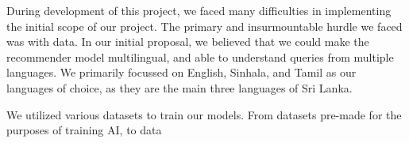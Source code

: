 During development of this project, we faced many difficulties in implementing the initial scope of our project. The primary and insurmountable hurdle we faced was with data. In our initial proposal, we believed that we could make the recommender model multilingual, and able to understand queries from multiple languages. We primarily focussed on English, Sinhala, and Tamil as our languages of choice, as they are the main three languages of Sri Lanka.

We utilized various datasets to train our models. From datasets pre-made for the purposes of training AI, to data 